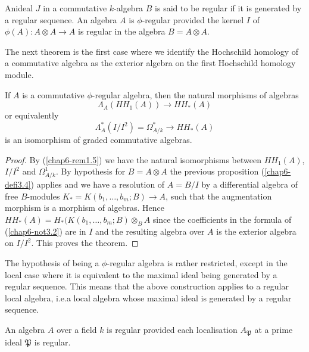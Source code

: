\begin{definition}\label{chap6-defi3.4}
An\pageoriginale ideal $J$ in a commutative $k$-algebra $B$ is said to
be regular if it is generated by a regular sequence. An algebra $A$ is
$\phi$-regular provided the kernel $I$ of $\phi(A):A\otimes A\to A$ is
regular in the algebra $B=A\otimes A$.
\end{definition}

The next theorem is the first case where we identify the Hochschild
homology of a commutative algebra as the exterior algebra on the first
Hochschild homology module.

\begin{theorem}\label{chap6-thm3.5}
If $A$ is a commutative $\phi$-regular algebra, then the natural
morphisms of algebras
$$
\Lambda_{A}(HH_{1}(A))\to HH_{\ast}(A)
$$
or equivalently
$$
\Lambda^{*}_{A}(I/I^{2})=\Omega^{*}_{A/k}\to HH_{\ast}(A)
$$
is an isomorphism of graded commutative algebras.
\end{theorem}

\begin{proof}
By (\ref{chap6-rem1.5}) we have the natural isomorphisms between
$HH_{1}(A)$, $I/I^{2}$ and $\Omega^{1}_{A/k}$. By hypothesis for
$B=A\otimes A$ the previous proposition (\ref{chap6-defi3.4}) applies
and we have a resolution of $A=B/I$ by a differential algebra of free
$B$-modules $K_{\ast}=K(b_{1},\ldots,b_{m};B)\to A$, such that the
augmentation morphism is a morphism of algebras. Hence
$HH_{\ast}(A)=H_{\ast}(K(b_{1},\ldots,b_{m};B)\otimes_{B}A$ since the
coefficients in the formula of (\ref{chap6-not3.2}) are in $I$ and the
resulting algebra over $A$ is the exterior algebra on $I/I^{2}$. This
proves the theorem. 
\end{proof}

\begin{remark}\label{chap6-rem3.6}
The hypothesis of being a $\phi$-regular algebra is rather restricted,
except in the local case where it is equivalent to the maximal ideal
being generated by a regular sequence. This means that the above
construction applies to a regular local algebra, i.e.\@ a local
algebra whose maximal ideal is generated by a regular sequence.
\end{remark}

\begin{definition}\label{chap6-defi3.7}
An algebra $A$ over a field $k$ is regular provided each localisation
$A_{\mathfrak{P}}$ at a prime ideal $\mathfrak{P}$ is regular.
\end{definition}

